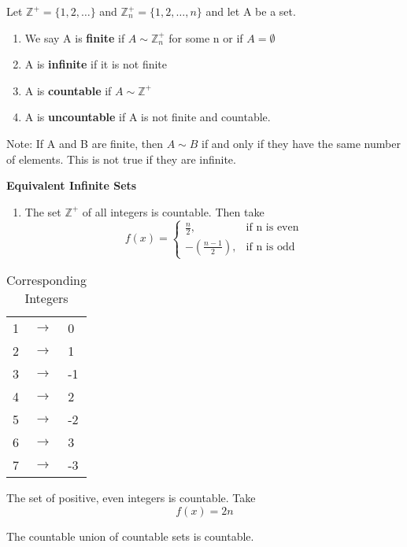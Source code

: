 \documentclass[11pt,fleqn]{book} %
\begin{document}
\begin{definition}
	Let $\mathbb{Z}^+ = \{1, 2, \dots \}$ and $\mathbb{Z}_n^+ = \{1, 2, \dots, n\}$ and let A be a set.
	\begin{enumerate}[label = \alph*)]
		\item We say A is \textbf{finite} if $A \sim \mathbb{Z}^+_n$ for some n or if $A = \emptyset$
		\item A is \textbf{infinite} if it is not finite
		\item A is \textbf{countable} if $A \sim \mathbb{Z}^+$
		\item A is \textbf{uncountable} if A is not finite and countable.
	\end{enumerate}
	Note: If A and B are finite, then $A \sim B$ if and only if they have the same number of elements. This is not true if they are infinite. 
\end{definition}

\begin{example}
	\textbf{Equivalent Infinite Sets}
	\begin{enumerate}
		\item The set $\mathbb{Z}^+$ of all integers is countable. Then take
			 $$ f(x) = \begin{cases}
	  		\frac{n}{2}, & \text{if n is even} \\
	  		-(\frac{n-1}{2}), & \text{if n is odd} 
			\end{cases} $$
			\end{enumerate}

			\begin{table}[h]
			\centering
			\begin{tabular}{l l l}
			1 & $\rightarrow$ & 0 \\
			2 & $\rightarrow$ & 1 \\
			3 & $\rightarrow$ & -1 \\
			4 & $\rightarrow$ & 2 \\
			5 & $\rightarrow$ & -2 \\
			6 & $\rightarrow$ & 3 \\
			7 & $\rightarrow$ & -3 \\
			\end{tabular}
			\caption{Corresponding Integers}
			\end{table}
		\item The set of positive, even integers is countable. Take
	$$f(x)=2n $$	
\end{example}

\begin{theorem}
	The countable union of countable sets is countable.
\end{theorem}
\end{document}
